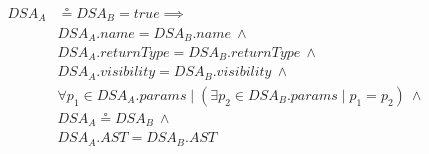 \begin{itemize}
\begin{equation}
\begin{split}
  DSA_{A} & \circeq DSA_{B} = true \implies \\
   & DSA_{A}.name = DSA_{B}.name ~ \wedge \\
   & DSA_{A}.returnType = DSA_{B}.returnType ~ \wedge \\
   & DSA_{A}.visibility = DSA_{B}.visibility ~ \wedge \\
   & \forall p_1 \in DSA_{A}.params \mid (\exists p_2 \in DSA_{B}.params \mid p_1 = p_2)  ~ \wedge \\
   & DSA_{A} \circeq DSA_{B} ~ \wedge \\
   & DSA_{A}.AST = DSA_{B}.AST
 \end{split}
\end{equation}
\end{itemize}




